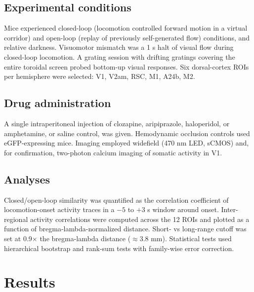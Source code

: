 \documentclass[11pt]{article}
\begin{document}
\subsection{Experimental conditions}
Mice experienced closed-loop (locomotion controlled forward motion in a virtual corridor) and open-loop (replay of previously self-generated flow) conditions, and relative darkness. Visuomotor mismatch was a 1 s halt of visual flow during closed-loop locomotion. A grating session with drifting gratings covering the entire toroidal screen probed bottom-up visual responses. Six dorsal-cortex ROIs per hemisphere were selected: V1, V2am, RSC, M1, A24b, M2.

\subsection{Drug administration}
A single intraperitoneal injection of clozapine, aripiprazole, haloperidol, or amphetamine, or saline control, was given. Hemodynamic occlusion controls used eGFP-expressing mice. Imaging employed widefield (470 nm LED, sCMOS) and, for confirmation, two-photon calcium imaging of somatic activity in V1.

\subsection{Analyses}
Closed/open-loop similarity was quantified as the correlation coefficient of locomotion-onset activity traces in a $-5$ to $+3$ s window around onset. Inter-regional activity correlations were computed across the 12 ROIs and plotted as a function of bregma-lambda-normalized distance. Short- vs long-range cutoff was set at 0.9$\times$ the bregma-lambda distance ($\approx$3.8 mm). Statistical tests used hierarchical bootstrap and rank-sum tests with family-wise error correction.

\section{Results}
\end{document}
